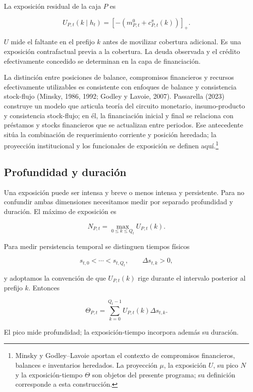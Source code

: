 \documentclass[10pt,a5paper,twoside]{article}
\begin{document}
La exposición residual de la caja \(P\) es

\[
U_{P,t}(k\mid h_t)
=
\left[
-\left(m^0_{P,t}+c^\pi_{P,t}(k)\right)
\right]_+.
\]

\(U\) mide el faltante en el prefijo \(k\) antes de movilizar cobertura
adicional. Es una exposición contrafactual previa a la cobertura. La deuda
observada y el crédito efectivamente concedido se determinan en la capa de
financiación.

La distinción entre posiciones de balance, compromisos financieros y
recursos efectivamente utilizables es consistente con enfoques de
balance y consistencia stock-flujo (Minsky, 1986, 1992; Godley y Lavoie,
2007). Passarella (2023) construye un modelo que articula teoría del circuito
monetario, insumo-producto y consistencia stock-flujo; en él, la financiación
inicial y final se relaciona con préstamos y stocks financieros que se
actualizan entre periodos. Ese antecedente sitúa la combinación de
requerimiento corriente y posición heredada; la proyección institucional y
los funcionales de exposición se definen aquí.\footnote{Minsky y Godley--Lavoie aportan el contexto de
  compromisos financieros, balances e inventarios heredados. La proyección \(\mu\), la exposición \(U\), su pico \(N\) y la
  exposición-tiempo \(\Theta\) son objetos del presente programa; su
  definición corresponde a esta construcción.}

\subsection{Profundidad y duración}\label{profundidad-y-duraciuxf3n}

Una exposición puede ser intensa y breve o menos intensa y persistente. Para no
confundir ambas dimensiones necesitamos medir por separado profundidad y duración.
El máximo de exposición es

\[
N_{P,t}
=
\max_{0\le k\le Q_t}U_{P,t}(k).
\]

Para medir persistencia temporal se distinguen tiempos físicos

\[
s_{t,0}<\cdots<s_{t,Q_t},
\qquad
\Delta s_{t,k}>0,
\]

y adoptamos la convención de que \(U_{P,t}(k)\) rige durante el
intervalo posterior al prefijo \(k\). Entonces

\[
\Theta_{P,t}
=
\sum_{k=0}^{Q_t-1}
U_{P,t}(k)\Delta s_{t,k}.
\]

El pico mide profundidad; la exposición-tiempo incorpora además su
duración.
\end{document}
